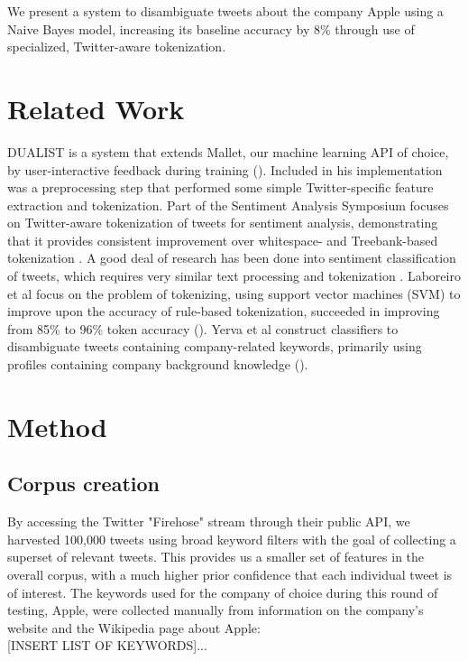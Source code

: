 \documentclass[letterpaper]{article}
\begin{document}
We present a system to disambiguate tweets about the company Apple using a Naive Bayes model, increasing its baseline accuracy by 8\% through use of specialized, Twitter-aware tokenization.

\section{Related Work}
DUALIST is a system that extends Mallet, our machine learning API of choice, by user-interactive feedback during training (\citeauthor{Settles:2011:CLF:2145432.2145588}). Included in his implementation was a preprocessing step that performed some simple Twitter-specific feature extraction and tokenization. Part of the Sentiment Analysis Symposium focuses on Twitter-aware tokenization of tweets for sentiment analysis, demonstrating that it provides consistent improvement over whitespace- and Treebank-based tokenization \cite{potts2011}. A good deal of research has been done into sentiment classification of tweets, which requires very similar text processing and tokenization \cite{Pak10}. Laboreiro et al focus on the problem of tokenizing, using support vector machines (SVM) to improve upon the accuracy of rule-based tokenization, succeeded in improving from 85\% to 96\% token accuracy (\citeauthor{Laboreiro:2010:TMM:1871840.1871853}). Yerva et al construct classifiers to disambiguate tweets containing company-related keywords, primarily using profiles containing company background knowledge (\citeauthor{journals/ijcsa/YervaMA12}). 

\section{Method}
\subsection{Corpus creation}
By accessing the Twitter "Firehose" stream through their public API, we harvested 100,000 tweets using broad keyword filters with the goal of collecting a superset of relevant tweets. This provides us a smaller set of features in the overall corpus, with a much higher prior confidence that each individual tweet is of interest. The keywords used for the company of choice during this round of testing, Apple, were collected manually from information on the company's website and the Wikipedia page about Apple:\\

[INSERT LIST OF KEYWORDS]...\\
\end{document}
